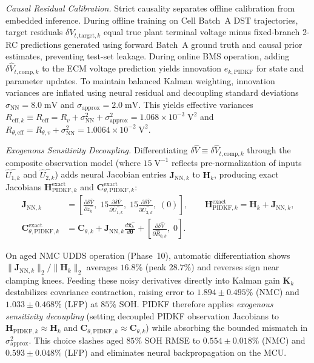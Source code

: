 \documentclass[10pt,a4paper]{article}
\begin{document}
\emph{Causal Residual Calibration.} Strict causality separates offline calibration from embedded inference. During offline training on Cell Batch~A DST trajectories, target residuals $\delta V_{t,\text{target},k}$ equal true plant terminal voltage minus fixed-branch 2-RC predictions generated using forward Batch~A ground truth and causal prior estimates, preventing test-set leakage. During online BMS operation, adding $\delta\hat{V}_{t,\text{comp},k}$ to the ECM voltage prediction yields innovation $e_{k,\text{PIDKF}}$ for state and parameter updates. To maintain balanced Kalman weighting, innovation variances are inflated using neural residual and decoupling standard deviations $\sigma_{\text{NN}} = 8.0\;\mathrm{mV}$ and $\sigma_{\text{approx}} = 2.0\;\mathrm{mV}$. This yields effective variances $R_{\text{eff},k} \equiv R_{\text{eff}} = R_v + \sigma_{\text{NN}}^2 + \sigma_{\text{approx}}^2 = 1.068 \times 10^{-3}\;\mathrm{V}^2$ and $R_{\theta,\text{eff}} = R_{\theta,v} + \sigma_{\text{NN}}^2 = 1.0064 \times 10^{-2}\;\mathrm{V}^2$.

\emph{Exogenous Sensitivity Decoupling.} Differentiating $\delta\hat{V} \equiv \delta\hat{V}_{t,\text{comp},k}$ through the composite observation model (where $15\;\mathrm{V}^{-1}$ reflects pre-normalization of inputs $\hat{U}_{1,k}^-$ and $\hat{U}_{2,k}^-$) adds neural Jacobian entries $\mathbf{J}_{\text{NN},k}$ to $\mathbf{H}_k$, producing exact Jacobians $\mathbf{H}_{\text{PIDKF},k}^{\text{exact}}$ and $\mathbf{C}_{\theta,\text{PIDKF},k}^{\text{exact}}$:
\begin{align*}
\mathbf{J}_{\text{NN},k} &= \left[\frac{\partial\delta\hat{V}}{\partial\hat{z}_k^-},\; 15\frac{\partial\delta\hat{V}}{\partial\hat{U}_{1,k}^-},\; 15\frac{\partial\delta\hat{V}}{\partial\hat{U}_{2,k}^-},\; (0)\right], \qquad
\mathbf{H}_{\text{PIDKF},k}^{\text{exact}} = \mathbf{H}_k + \mathbf{J}_{\text{NN},k}, \\
\mathbf{C}_{\theta,\text{PIDKF},k}^{\text{exact}} &= \mathbf{C}_{\theta,k} + \mathbf{J}_{\text{NN},k}\frac{d\hat{\mathbf{x}}_k^-}{d\boldsymbol{\theta}} + \left[\frac{\partial \delta\hat{V}}{\partial \hat{R}_{0,k}^-},\; 0\right].
\end{align*}
{\sloppy On aged NMC UDDS operation (Phase~10), automatic differentiation shows $\|\mathbf{J}_{\text{NN},k}\|_2 / \|\mathbf{H}_k\|_2$ averages $16.8\%$ (peak $28.7\%$) and reverses sign near clamping knees. Feeding these noisy derivatives directly into Kalman gain $\mathbf{K}_k$ destabilizes covariance contraction, raising error to $1.894\pm0.495\%$ (NMC) and $1.033\pm0.468\%$ (LFP) at $85\%$ SOH. PIDKF therefore applies \emph{exogenous sensitivity decoupling} (setting decoupled PIDKF observation Jacobians to $\mathbf{H}_{\text{PIDKF},k} \approx \mathbf{H}_k$ and $\mathbf{C}_{\theta,\text{PIDKF},k} \approx \mathbf{C}_{\theta,k}$) while absorbing the bounded mismatch in $\sigma_{\text{approx}}^2$. This choice slashes aged $85\%$ SOH RMSE to $0.554\pm0.018\%$ (NMC) and $0.593\pm0.048\%$ (LFP) and eliminates neural backpropagation on the MCU.\par}
\end{document}
